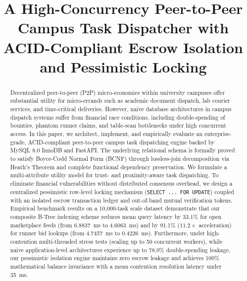 \documentclass[conference]{IEEEtran}
\begin{document}
\title{A High-Concurrency Peer-to-Peer Campus Task Dispatcher with ACID-Compliant Escrow Isolation and Pessimistic Locking}

\author{
}

\maketitle

\begin{abstract}
Decentralized peer-to-peer (P2P) micro-economies within university campuses offer substantial utility for micro-errands such as academic document dispatch, lab courier services, and time-critical deliveries. However, naive database architectures in campus dispatch systems suffer from financial race conditions, including double-spending of bounties, phantom runner claims, and table-scan bottlenecks under high concurrent access. In this paper, we architect, implement, and empirically evaluate an enterprise-grade, ACID-compliant peer-to-peer campus task dispatching engine backed by MySQL 8.0 InnoDB and FastAPI. The underlying relational schema is formally proved to satisfy Boyce-Codd Normal Form (BCNF) through lossless-join decomposition via Heath's Theorem and complete functional dependency preservation. We formulate a multi-attribute utility model for trust- and proximity-aware task dispatching. To eliminate financial vulnerabilities without distributed consensus overhead, we design a centralized pessimistic row-level locking mechanism (\texttt{SELECT ... FOR UPDATE}) coupled with an isolated escrow transaction ledger and out-of-band mutual verification tokens. Empirical benchmark results on a 10,000-task scale dataset demonstrate that our composite B-Tree indexing scheme reduces mean query latency by 33.1\% for open marketplace feeds (from 6.8837~ms to 4.6063~ms) and by 91.1\% ($11.2\times$ acceleration) for runner bid lookups (from 4.7457~ms to 0.4226~ms). Furthermore, under high-contention multi-threaded stress tests (scaling up to 50 concurrent workers), while naive application-level architectures experience up to 78.0\% double-spending leakage, our pessimistic isolation engine maintains zero escrow leakage and achieves 100\% mathematical balance invariance with a mean contention resolution latency under 35~ms.
\end{abstract}
\end{document}

